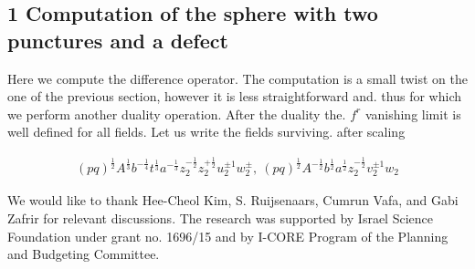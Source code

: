 \documentclass{article}
\begin{document}
\subsection*{1 Computation of the sphere with two punctures and a defect}


Here we compute the difference operator. The computation is a small twist
on the one of the previous section, however it is less straightforward and.
thus for which we perform another duality operation. After the duality the. $f ^ { r }$
vanishing limit is well defined for all fields. Let us write the fields surviving.
after scaling


\begin{equation}
\begin{array} { c } { ( p q ) ^ { \frac 1 2 } A ^ { \frac 1 3 } b ^ { - \frac 1 4 } t ^ { \frac 1 3 } a ^ { - \frac 1 3 } z _ { 2 } ^ { - \frac 1 2 } z _ { 2 } ^ { + \frac 1 2 } u _ { 2 } ^ { \pm 1 } w _ { 2 } ^ { \pm }, ~ ( p q ) ^ { \frac 1 2 } A ^ { - \frac 1 2 } b ^ { \frac 1 2 } a ^ { \frac 1 2 } z _ { 2 } ^ { - \frac 1 2 } v _ { 2 } ^ { \pm 1 } w _ { 2 }}\end{array}
\end{equation}


We would like to thank Hee-Cheol Kim, S. Ruijsenaars, Cumrun Vafa, and
Gabi Zafrir for relevant discussions. The research was supported by Israel
Science Foundation under grant no. 1696/15 and by I-CORE Program of the
Planning and Budgeting Committee.
\end{document}
